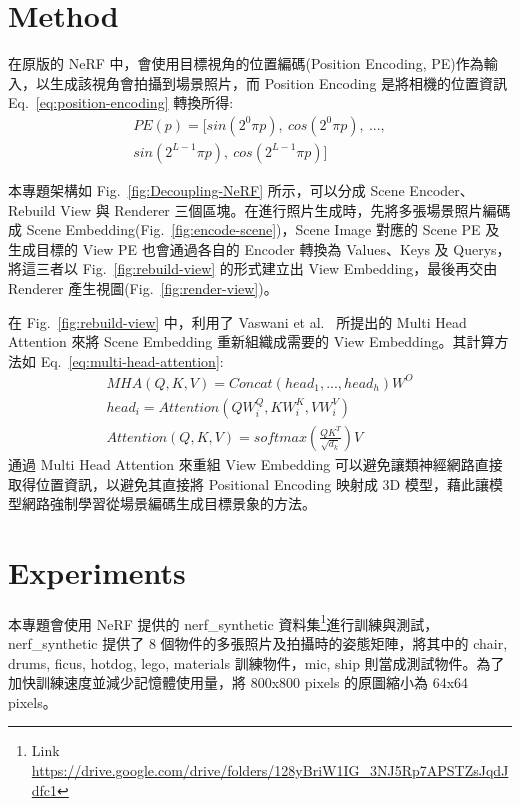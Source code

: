 \documentclass[10pt,twocolumn,letterpaper]{article}
\begin{document}
\begin{CJK}{UTF8}{bkai}
   \section{Method}

   在原版的 NeRF 中，會使用目標視角的位置編碼(Position Encoding,
   PE)作為輸入，以生成該視角會拍攝到場景照片，而 Position Encoding
   是將相機的位置資訊 Eq.~\ref{eq:position-encoding} 轉換所得:
   \begin{equation}
      \begin{aligned}
         PE(p)=[sin(2^{0}{\pi}{p}),~cos(2^{0}{\pi}{p}),~..., \\
         sin(2^{L-1}{\pi}{p}),~cos(2^{L-1}{\pi}{p})]
      \end{aligned}
      \label{eq:position-encoding}
   \end{equation}

   本專題架構如 Fig.~\ref{fig:Decoupling-NeRF} 所示，可以分成 Scene Encoder、Rebuild View 與 Renderer
   三個區塊。在進行照片生成時，先將多張場景照片編碼成 Scene Embedding(Fig.~\ref{fig:encode-scene})，Scene Image 對應的 Scene PE 及生成目標的 View
   PE 也會通過各自的 Encoder 轉換為 Values、Keys 及 Querys，將這三者以 Fig.~\ref{fig:rebuild-view} 的形式建立出
   View Embedding，最後再交由 Renderer 產生視圖(Fig.~\ref{fig:render-view})。

   在 Fig.~\ref{fig:rebuild-view} 中，利用了 Vaswani et al.~\cite{AttentionIsAllYouNeed} 所提出的
   Multi Head Attention 來將 Scene Embedding 重新組織成需要的 View Embedding。其計算方法如 Eq.~\ref{eq:multi-head-attention}:
   \begin{equation}
      \begin{aligned}
         MHA(Q, K, V) = Concat(head_{1},...,head_{h})W^{O}      \\
         head_{i} = Attention(QW^{Q}_{i},KW^{K}_{i},VW^{V}_{i}) \\
         Attention(Q, K, V ) = softmax(\frac{QK^{T}}{\sqrt{d_{k}}})V
      \end{aligned}
      \label{eq:multi-head-attention}
   \end{equation}
   通過 Multi Head Attention 來重組 View Embedding 可以避免讓類神經網路直接取得位置資訊，以避免其直接將
   Positional Encoding 映射成 3D 模型，藉此讓模型網路強制學習從場景編碼生成目標景象的方法。

   \section{Experiments}
   本專題會使用 NeRF 提供的 nerf\_synthetic 資料集\footnote{Link \href{https://drive.google.com/drive/folders/128yBriW1IG_3NJ5Rp7APSTZsJqdJdfc1}{https://drive.google.com/drive/folders/128yBriW1IG\_3NJ5Rp7APSTZsJqdJdfc1}}進行訓練與測試，nerf\_synthetic 提供了
   8 個物件的多張照片及拍攝時的姿態矩陣，將其中的 chair, drums, ficus, hotdog, lego, materials 訓練物件，mic, ship 則當成測試物件。為了加快訓練速度並減少記憶體使用量，將 800x800 pixels 的原圖縮小為 64x64 pixels。


\end{CJK}
\end{document}
